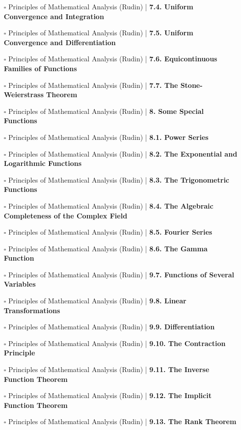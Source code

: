 \documentclass[a4, landscape, 12pt]{article}
\newcommand{\checkbox}{$\square$}%
\begin{document}
\begin{itemize}
{}
\item [\checkbox] Principles of Mathematical Analysis (Rudin)  | \textbf{7.4. Uniform Convergence and Integration
}
\item [\checkbox] Principles of Mathematical Analysis (Rudin)  | \textbf{7.5. Uniform Convergence and Differentiation
}
\item [\checkbox] Principles of Mathematical Analysis (Rudin)  | \textbf{7.6. Equicontinuous Families of Functions
}
\item [\checkbox] Principles of Mathematical Analysis (Rudin)  | \textbf{7.7. The Stone-Weierstrass Theorem
}
\item [\checkbox] Principles of Mathematical Analysis (Rudin)  | \textbf{8. Some Special Functions
}
\item [\checkbox] Principles of Mathematical Analysis (Rudin)  | \textbf{8.1. Power Series
}
\item [\checkbox] Principles of Mathematical Analysis (Rudin)  | \textbf{8.2. The Exponential and Logarithmic Functions
}
\item [\checkbox] Principles of Mathematical Analysis (Rudin)  | \textbf{8.3. The Trigonometric Functions
}
\item [\checkbox] Principles of Mathematical Analysis (Rudin)  | \textbf{8.4. The Algebraic Completeness of the Complex Field
}
\item [\checkbox] Principles of Mathematical Analysis (Rudin)  | \textbf{8.5. Fourier Series
}
\item [\checkbox] Principles of Mathematical Analysis (Rudin)  | \textbf{8.6. The Gamma Function
}
\item [\checkbox] Principles of Mathematical Analysis (Rudin)  | \textbf{9.7. Functions of Several Variables
}
\item [\checkbox] Principles of Mathematical Analysis (Rudin)  | \textbf{9.8. Linear Transformations
}
\item [\checkbox] Principles of Mathematical Analysis (Rudin)  | \textbf{9.9. Differentiation
}
\item [\checkbox] Principles of Mathematical Analysis (Rudin)  | \textbf{9.10. The Contraction Principle
}
\item [\checkbox] Principles of Mathematical Analysis (Rudin)  | \textbf{9.11. The Inverse Function Theorem
}
\item [\checkbox] Principles of Mathematical Analysis (Rudin)  | \textbf{9.12. The Implicit Function Theorem
}
\item [\checkbox] Principles of Mathematical Analysis (Rudin)  | \textbf{9.13. The Rank Theorem
}
\end{itemize}
\end{document}
